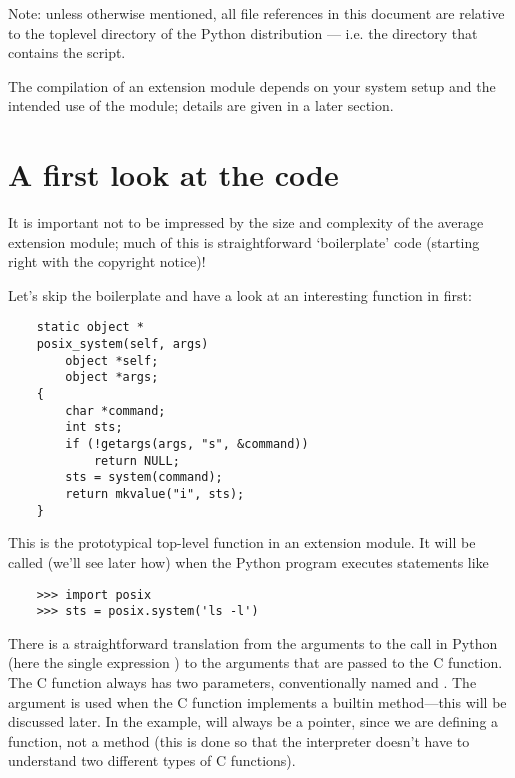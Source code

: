 Note: unless otherwise mentioned, all file references in this
document are relative to the toplevel directory of the Python
distribution --- i.e. the directory that contains the 
script.

The compilation of an extension module depends on your system setup
and the intended use of the module; details are given in a later
section.


\section{A first look at the code}

It is important not to be impressed by the size and complexity of
the average extension module; much of this is straightforward
`boilerplate' code (starting right with the copyright notice)!

Let's skip the boilerplate and have a look at an interesting function
in  first:

\begin{verbatim}
    static object *
    posix_system(self, args)
        object *self;
        object *args;
    {
        char *command;
        int sts;
        if (!getargs(args, "s", &command))
            return NULL;
        sts = system(command);
        return mkvalue("i", sts);
    }
\end{verbatim}

This is the prototypical top-level function in an extension module.
It will be called (we'll see later how) when the Python program
executes statements like

\begin{verbatim}
    >>> import posix
    >>> sts = posix.system('ls -l')
\end{verbatim}

There is a straightforward translation from the arguments to the call
in Python (here the single expression ) to the arguments that
are passed to the C function.  The C function always has two
parameters, conventionally named  and .  The
 argument is used when the C function implements a builtin
method---this will be discussed later.
In the example,  will always be a  pointer, since
we are defining a function, not a method (this is done so that the
interpreter doesn't have to understand two different types of C
functions).

